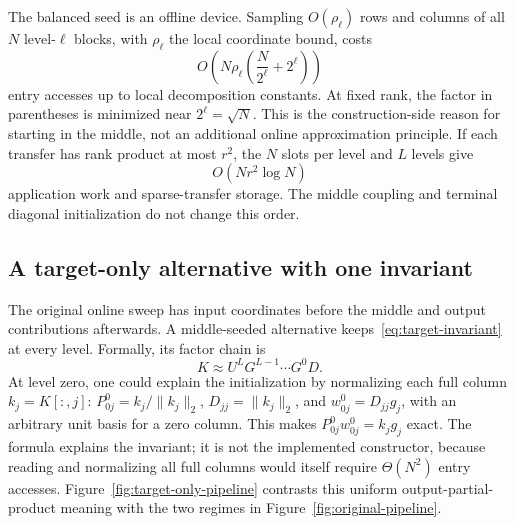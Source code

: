 \documentclass[11pt,a4paper]{article}
\begin{document}
The balanced seed is an offline device. Sampling $O(\rho_\ell)$ rows and columns of all $N$ level-$\ell$ blocks, with $\rho_\ell$ the local coordinate bound, costs
\[
 O\!\left(N\rho_\ell\left(\frac{N}{2^\ell}+2^\ell\right)\right)
\]
entry accesses up to local decomposition constants. At fixed rank, the factor in parentheses is minimized near $2^\ell=\sqrt N$. This is the construction-side reason for starting in the middle, not an additional online approximation principle. If each transfer has rank product at most $r^2$, the $N$ slots per level and $L$ levels give
\begin{equation}
 O(Nr^2\log N)
 \label{eq:online-transfer-cost}
\end{equation}
application work and sparse-transfer storage. The middle coupling and terminal diagonal initialization do not change this order.

\subsection{A target-only alternative with one invariant}
\label{sec:target-only}

The original online sweep has input coordinates before the middle and output contributions afterwards. A middle-seeded alternative keeps~\eqref{eq:target-invariant} at every level. Formally, its factor chain is
\begin{equation}
 K\approx U^LG^{L-1}\cdots G^0D.
 \label{eq:target-only-chain}
\end{equation}
At level zero, one could explain the initialization by normalizing each full column $k_j=K[:,j]$: $P_{0j}^0=k_j/\|k_j\|_2$, $D_{jj}=\|k_j\|_2$, and $w_{0j}^0=D_{jj}g_j$, with an arbitrary unit basis for a zero column. This makes $P_{0j}^0w_{0j}^0=k_jg_j$ exact. The formula explains the invariant; it is not the implemented constructor, because reading and normalizing all full columns would itself require $\Theta(N^2)$ entry accesses. Figure~\ref{fig:target-only-pipeline} contrasts this uniform output-partial-product meaning with the two regimes in Figure~\ref{fig:original-pipeline}.
\end{document}
